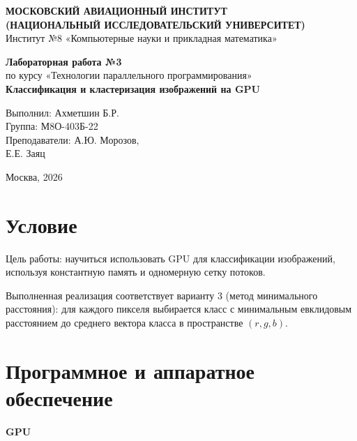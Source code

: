 \documentclass[a4paper,14pt]{extarticle}
\begin{document}
\begin{titlepage}
\begin{center}
\textbf{МОСКОВСКИЙ АВИАЦИОННЫЙ ИНСТИТУТ}\\
\textbf{(НАЦИОНАЛЬНЫЙ ИССЛЕДОВАТЕЛЬСКИЙ УНИВЕРСИТЕТ)}\\
Институт №8 «Компьютерные науки и прикладная математика»
\end{center}

\vspace{3.5cm}
\begin{center}
\textbf{\Large Лабораторная работа №3}\\
\vspace{0.3cm}
по курсу «Технологии параллельного программирования»\\
\vspace{0.8cm}
\textbf{Классификация и кластеризация изображений на GPU}
\end{center}

\vspace{4cm}
\begin{flushright}
Выполнил: Ахметшин Б.Р.\\
Группа: М8О-403Б-22\\
Преподаватели: А.Ю. Морозов,\\
\hspace*{3.6cm} Е.Е. Заяц
\end{flushright}

\vfill
\begin{center}
Москва, 2026
\end{center}
\end{titlepage}

\section*{Условие}
Цель работы: научиться использовать GPU для классификации изображений,
используя константную память и одномерную сетку потоков.

Выполненная реализация соответствует варианту 3 (метод минимального расстояния):
для каждого пикселя выбирается класс с минимальным евклидовым расстоянием
до среднего вектора класса в пространстве \((r,g,b)\).

\section*{Программное и аппаратное обеспечение}
\textbf{GPU}
\end{document}
